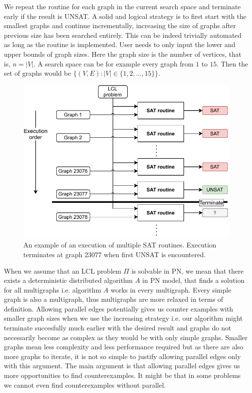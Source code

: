We repeat the routine for each graph in the current search space and terminate early if the result is UNSAT.
A solid and logical strategy is to first start with the smallest graphs and continue incrementally, increasing the size of graphs  after previous size has been searched entirely.
This can be indeed trivially automated as long as the routine is implemented.
User needs to only input the lower and upper bounds of graph sizes.
Here the graph size is the number of vertices, that is, $n=|V|$.
A search space can be for example every graph from $1$ to $15$.
Then the set of graphs would be $\{(V, E) : |V| \in \{1, 2, ..., 15\} \}$.

\begin{figure}[H]
\centering
\includegraphics[]{diagrams/implementation_idea_diagram3.pdf}
\caption{An example of an execution of multiple SAT routines. Execution terminates at graph $23077$ when first UNSAT is encountered.}
\label{fig:implementatio:idea:2}
\end{figure}


When we assume that an LCL problem $\Pi$ is solvable in PN, we mean that there exists a deterministic distributed algorithm $A$ in PN model, that finds a solution for all multigraphs i.e. algorithm $A$ works in every multigraph.
Every simple graph is also a multigraph, thus multigraphs are more relaxed in terms of definition.
Allowing parallel edges potentially gives us counter examples with smaller graph sizes when we use the increasing strategy i.e. our algorithm might terminate succesfully much earlier with the desired result and graphs do not necessarily become as complex as they would be with only simple graphs.
Smaller graphs mean less complexity and less performance required but as there are also more graphs to iterate, it is not so simple to justify allowing parallel edges only with this argument.
The main argument is that allowing parallel edges gives us more opportunities to find counterexamples.
It might be that in some problems we cannot even find counterexamples without parallel.

